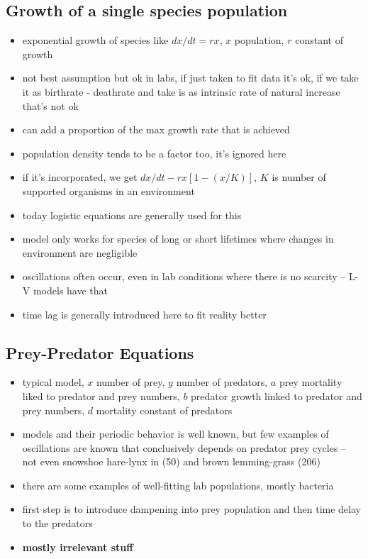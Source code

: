 \documentclass[a4paper,reqno,11pt]{article}
\begin{document}
\subsection{Growth of a single species population}

\begin{itemize}
    \item exponential growth of species like $dx/dt=rx$, $x$ population, $r$
        constant of growth
    \item not best assumption but ok in labs, if just taken to fit data it's
        ok, if we take it as birthrate - deathrate and take is as intrinsic
        rate of natural increase that's not ok
    \item can add a proportion of the max growth rate that is achieved
    \item population density tends to be a factor too, it's ignored here
    \item if it's incorporated, we get $dx/dt-rx[1-(x/K)]$, $K$ is number of
        supported organisms in an environment
    \item today logistic equations are generally used for this
    \item model only works for species of long or short lifetimes where changes
        in environment are negligible 
    \item oscillations often occur, even in lab conditions where there is no
        scarcity -- L-V models have that
    \item time lag is generally introduced here to fit reality better
\end{itemize}

\subsection{Prey-Predator Equations}

\begin{itemize}
    \item typical model, $x$ number of prey, $y$ number of predators, $a$ prey
        mortality liked to predator and prey numbers, $b$ predator growth
        linked to predator and prey numbers, $d$ mortality constant of
        predators
    \item models and their periodic behavior is well known, but few examples of
        oscillations are known that conclusively depends on predator prey
        cycles -- not even snowshoe hare-lynx in (50) and brown lemming-grass
        (206)
    \item there are some examples of well-fitting lab populations, mostly
        bacteria
    \item first step is to introduce dampening into prey population and then
        time delay to the predators
    \item \textbf{mostly irrelevant stuff}
\end{itemize}



\nocite{*}

\end{document}
